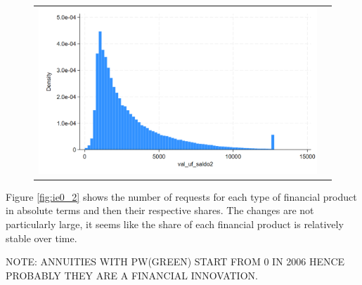 \documentclass[12pt]{article}
\begin{document}
\begin{figure}[H]
\caption{}
\label{fig:ie0_1}
\centering{}%
\begin{tabular}{cc}
\includegraphics[scale=0.27]{../figures/IE0_plot1.png} 
\end{tabular}
\end{figure}



Figure \ref{fig:ie0_2} shows the number of requests for each type of financial product in absolute terms and then their respective shares. The changes are not particularly large, it seems like the share of each financial product is relatively stable over time.

NOTE: ANNUITIES WITH PW(GREEN) START FROM 0 IN 2006 HENCE PROBABLY THEY ARE A FINANCIAL INNOVATION. 
\end{document}
